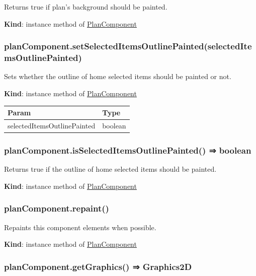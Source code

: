 \documentclass[a4paper]{report}
\begin{document}
Returns true if plan's background should be painted.

\textbf{Kind}: instance method of
\protect\hyperlink{PlanComponent}{PlanComponent}\\

\hypertarget{plancomponent.setselecteditemsoutlinepaintedselecteditemsoutlinepainted}{%
\subsubsection{planComponent.setSelectedItemsOutlinePainted(selectedItemsOutlinePainted)}\label{plancomponent.setselecteditemsoutlinepaintedselecteditemsoutlinepainted}}

Sets whether the outline of home selected items should be painted or
not.

\textbf{Kind}: instance method of
\protect\hyperlink{PlanComponent}{PlanComponent}

\begin{longtable}[]{@{}ll@{}}
\toprule
Param & Type\tabularnewline
\midrule
\endhead
selectedItemsOutlinePainted & boolean\tabularnewline
\bottomrule
\end{longtable}

\hypertarget{plancomponent.isselecteditemsoutlinepainted-boolean}{%
\subsubsection{planComponent.isSelectedItemsOutlinePainted() ⇒
boolean}\label{plancomponent.isselecteditemsoutlinepainted-boolean}}

Returns true if the outline of home selected items should be painted.

\textbf{Kind}: instance method of
\protect\hyperlink{PlanComponent}{PlanComponent}\\

\hypertarget{plancomponent.repaint}{%
\subsubsection{planComponent.repaint()}\label{plancomponent.repaint}}

Repaints this component elements when possible.

\textbf{Kind}: instance method of
\protect\hyperlink{PlanComponent}{PlanComponent}\\

\hypertarget{plancomponent.getgraphics-graphics2d}{%
\subsubsection{planComponent.getGraphics() ⇒
Graphics2D}\label{plancomponent.getgraphics-graphics2d}}
\end{document}
